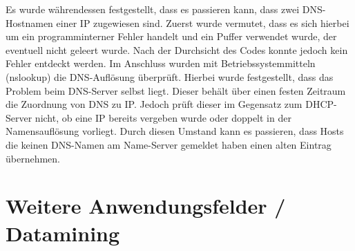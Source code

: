 Es wurde währendessen festgestellt, dass es passieren kann, dass zwei DNS-Hostnamen einer IP zugewiesen sind. Zuerst wurde vermutet, dass es sich hierbei um ein programminterner Fehler handelt und ein Puffer verwendet wurde, der eventuell nicht geleert wurde. Nach der Durchsicht des Codes konnte jedoch kein Fehler entdeckt werden. Im Anschluss wurden mit Betriebssystemmitteln (nslookup) die DNS-Auflösung überprüft. Hierbei wurde festgestellt, dass das Problem beim DNS-Server selbst liegt. Dieser behält über einen festen Zeitraum die Zuordnung von DNS zu IP.
Jedoch prüft dieser im Gegensatz zum DHCP-Server nicht, ob eine IP bereits vergeben wurde oder doppelt in der Namensauflösung vorliegt. Durch diesen Umstand kann es passieren, dass Hosts die keinen DNS-Namen am Name-Server gemeldet haben einen alten Eintrag übernehmen.


\section{Weitere Anwendungsfelder / Datamining}
\label{sec:otherthoughts}

